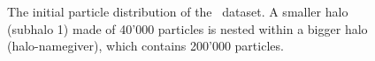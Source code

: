 \begin{figure}[htbp!]
	\centering
		\centering
		\caption{
			The initial particle distribution of the \dt\ dataset. A smaller halo (subhalo 1) made of 40'000 particles is nested within a bigger halo (halo-namegiver), which contains 200'000 particles.
		}%
		\label{fig:dice_two_origin}
	\endminipage%
	\hspace*{\fill}
		\centering

\end{figure}
